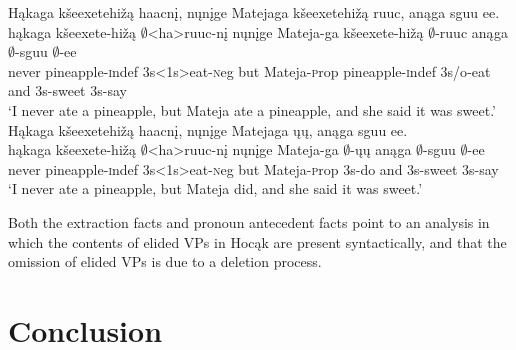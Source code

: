 \documentclass[output=paper]{LSP/langsci}
\begin{document}
\begin{exe}
\ex
\begin{xlist}
\ex
\glll H\k{a}kaga k\v{s}eexetehi\v{z}\k{a} haacn\k{i}, n\k{u}n\k{i}ge Matejaga k\v{s}eexetehi\v{z}\k{a} ruuc, an\k{a}ga sguu ee.\\
h\k{a}kaga k\v{s}eexete-hi\v{z}\k{a} $\emptyset$<ha>ruuc-n\k{i} n\k{u}n\k{i}ge Mateja-ga k\v{s}eexete-hi\v{z}\k{a} $\emptyset$-ruuc an\k{a}ga $\emptyset$-sguu $\emptyset$-ee\\
never pineapple-{\textsc indef} {\textsc 3s<1s>}eat-{\textsc neg} but Mateja-{\textsc prop} pineapple-{\textsc indef} {\textsc 3s/o}-eat and {\textsc 3s}-sweet {\textsc 3s}-say\\
\trans `I never ate a pineapple, but Mateja ate a pineapple, and she said it was sweet.'
\ex
\glll H\k{a}kaga k\v{s}eexetehi\v{z}\k{a} haacn\k{i}, n\k{u}n\k{i}ge Matejaga \k{u}\k{u}, an\k{a}ga sguu ee.\\
h\k{a}kaga k\v{s}eexete-hi\v{z}\k{a} $\emptyset$<ha>ruuc-n\k{i} n\k{u}n\k{i}ge Mateja-ga $\emptyset$-\k{u}\k{u} an\k{a}ga $\emptyset$-sguu $\emptyset$-ee\\
never pineapple-{\textsc indef} {\textsc 3s<1s>}eat-{\textsc neg} but Mateja-{\textsc prop} {\textsc 3s}-do and {\textsc 3s}-sweet {\textsc 3s}-say\\
\trans `I never ate a pineapple, but Mateja did, and she said it was sweet.'
\end{xlist}
\end{exe}

\begin{exe}
\end{exe}


Both the extraction facts and pronoun antecedent facts point to an analysis in which the contents of elided VPs in Hoc\k{a}k are present syntactically, and that the omission of elided VPs is due to a deletion process.

\section{Conclusion}
\end{document}
